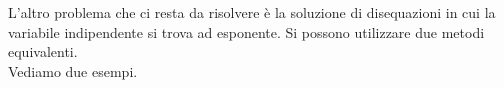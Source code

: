 L'altro problema che ci resta da risolvere è la soluzione di disequazioni 
in cui la variabile indipendente si trova ad esponente. 
% 
Si possono utilizzare due metodi equivalenti. \\
Vediamo due esempi.


